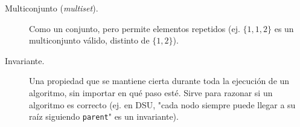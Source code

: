 \begin{description}
  \item[Multiconjunto (\textit{multiset}).] Como un conjunto, pero permite elementos repetidos (ej. \(\{1,1,2\}\) es un multiconjunto válido, distinto de \(\{1,2\}\)).

  \item[Invariante.] Una propiedad que se mantiene cierta durante toda la ejecución de un algoritmo, sin importar en qué paso esté. Sirve para razonar si un algoritmo es correcto (ej. en DSU, "cada nodo siempre puede llegar a su raíz siguiendo \texttt{parent}" es un invariante).
\end{description}
